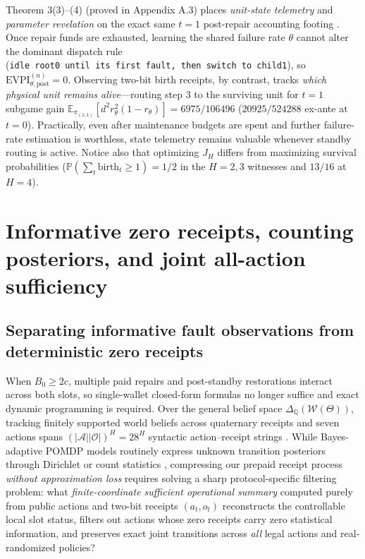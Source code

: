 \documentclass[11pt,letterpaper]{article}
\begin{document}
Theorem 3(3)--(4) (proved in Appendix A.3) places \emph{unit-state
telemetry} and \emph{parameter revelation} on the exact same \(t = 1\)
post-repair accounting footing
\citep{striebel1965, kumarVaraiya1986, krishnamurthy2016}. Once repair
funds are exhausted, learning the shared failure rate \(\theta\) cannot
alter the dominant dispatch rule
(\texttt{idle\ root0\ until\ its\ first\ fault,\ then\ switch\ to\ child1}),
so \(\mathrm{EVPI}_{\theta,\mathrm{post}}^{(n)} = 0\). Observing two-bit
birth receipts, by contrast, tracks \emph{which physical unit remains
alive}---routing step \(3\) to the surviving unit for \(t = 1\) subgame
gain
\(\mathbb{E}_{\pi_{(1,1)}}[d^2 r_\theta^2(1 - r_\theta)] = 6975 / 106496\)
(\(20925 / 524288\) ex-ante at \(t = 0\)). Practically, even after
maintenance budgets are spent and further failure-rate estimation is
worthless, state telemetry remains valuable whenever standby routing is
active. Notice also that optimizing \(J_H\) differs from maximizing
survival probabilities
(\(\mathbb{P}(\sum_t \mathrm{birth}_t \ge 1) = 1/2\) in the \(H=2,3\)
witnesses and \(13/16\) at \(H=4\)).

\section{Informative zero receipts, counting posteriors, and joint
all-action
sufficiency}\label{informative-zero-receipts-counting-posteriors-and-joint-all-action-sufficiency}

\subsection{Separating informative fault observations from deterministic
zero
receipts}\label{separating-informative-fault-observations-from-deterministic-zero-receipts}

When \(B_0 \ge 2c\), multiple paid repairs and post-standby restorations
interact across both slots, so single-wallet closed-form formulas no
longer suffice and exact dynamic programming is required. Over the
general belief space \(\Delta_{\mathbb{Q}}(\mathcal{W}(\Theta))\),
tracking finitely supported world beliefs across quaternary receipts and
seven actions spans \((|\mathcal{A}||\mathcal{O}|)^H = 28^H\) syntactic
action--receipt strings
\citep{papadimitriouTsitsiklis1987, cassandra1997, hauskrecht2000}.
While Bayes-adaptive POMDP models routinely express unknown transition
posteriors through Dirichlet or count statistics
\citep{martin1967, duff2002, ross2011}, compressing our prepaid receipt
process \emph{without approximation loss}
\citep{liWalshLittman2006, subramanian2022} requires solving a sharp
protocol-specific filtering problem: what \emph{finite-coordinate
sufficient operational summary} computed purely from public actions and
two-bit receipts \((a_t, o_t)\) reconstructs the controllable local slot
status, filters out actions whose zero receipts carry zero statistical
information, and preserves exact joint transitions across \emph{all}
legal actions and real-randomized policies?
\end{document}
